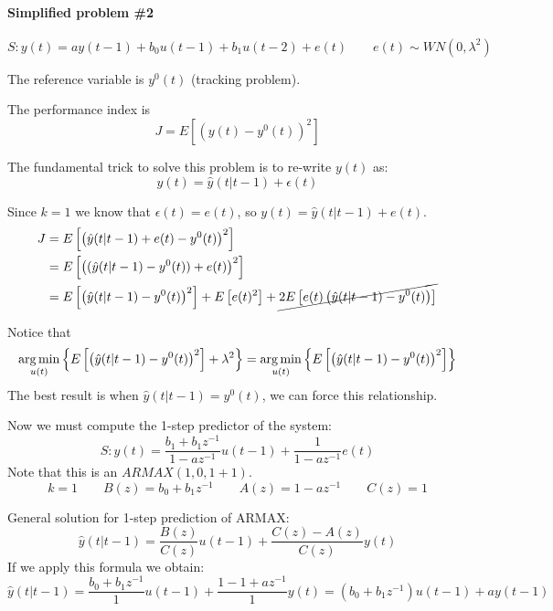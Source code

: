 \paragraph{Simplified problem \#2}
\[
    S: y(t) = ay(t-1) + b_0u(t-1) + b_1u(t-2) + e(t) \qquad e(t) \sim WN(0, \lambda^2)
\]

The reference variable is $y^0(t)$ (tracking problem).

The performance index is
\[
    J = E\left[ (y(t) - y^0(t))^2 \right]
\]

The fundamental trick to solve this problem is to re-write $y(t)$ as:
\[
    y(t) = \hat{y}(t|t-1) + \epsilon(t)
\]

Since $k=1$ we know that $\epsilon(t) = e(t)$, so $y(t) = \hat{y}(t|t-1)+e(t)$.
\begin{align*}
    J &= E\left[ \left(\hat{y}(t|t-1)+e(t) - y^0(t)\right)^2 \right] \\
    &= E\left[   \left((\hat{y}(t|t-1)-y^0(t)) +e(t)\right)^2 \right] \\
    &= E\left[ \left(\hat{y}(t|t-1)-y^0(t)\right)^2 \right] + E\left[e(t)^2\right] + \cancel{2E\left[e(t)\left( \hat{y}(t|t-1)-y^0(t) \right)\right]} \\
\end{align*}

Notice that
\[
    \operatorname*{arg\,min}_{u(t)} \left\{ E\left[ \left(\hat{y}(t|t-1)-y^0(t)\right)^2 \right] + \lambda^2 \right\} = \operatorname*{arg\,min}_{u(t)} \left\{ E\left[ \left(\hat{y}(t|t-1)-y^0(t)\right)^2 \right] \right\}
\]
The best result is when $\hat{y}(t|t-1)=y^0(t)$, we can force this relationship.

Now we must compute the 1-step predictor of the system:
\[
    S: y(t) = \frac{b_1+b_1z^{-1}}{1-az^{-1}}u(t-1) + \frac{1}{1-az^{-1}}e(t)
\]
Note that this is an $ARMAX(1,0,1+1)$.
\[
    k=1 \qquad B(z) = b_0+b_1z^{-1} \qquad A(z)=1-az^{-1} \qquad C(z) = 1
\]

General solution for 1-step prediction of ARMAX:
\[
    \hat{y}(t|t-1) = \frac{B(z)}{C(z)}u(t-1) + \frac{C(z)-A(z)}{C(z)}y(t)
\]
If we apply this formula we obtain:
\[
    \hat{y}(t|t-1) = \frac{b_0+b_1z^{-1}}{1}u(t-1) + \frac{1-1+az^{-1}}{1}y(t) = (b_0+b_1z^{-1})u(t-1)+ay(t-1)
\]

